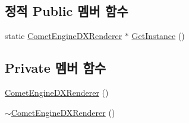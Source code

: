 \subsection*{정적 Public 멤버 함수}
\begin{DoxyCompactItemize}
\item 
static \hyperlink{class_comet_engine_1_1_renderer_1_1_comet_engine_d_x_renderer}{Comet\+Engine\+D\+X\+Renderer} $\ast$ \hyperlink{class_comet_engine_1_1_renderer_1_1_comet_engine_d_x_renderer_a9894517531990b824a58e1f61c6d542e}{Get\+Instance} ()
\end{DoxyCompactItemize}
\subsection*{Private 멤버 함수}
\begin{DoxyCompactItemize}
\item 
\hyperlink{class_comet_engine_1_1_renderer_1_1_comet_engine_d_x_renderer_a5d4d4453042540bd1f4e4a36229b62f6}{Comet\+Engine\+D\+X\+Renderer} ()
\item 
\hyperlink{class_comet_engine_1_1_renderer_1_1_comet_engine_d_x_renderer_a7ec2ab41325dc127a1780c88d84a81e2}{$\sim$\+Comet\+Engine\+D\+X\+Renderer} ()
\end{DoxyCompactItemize}
